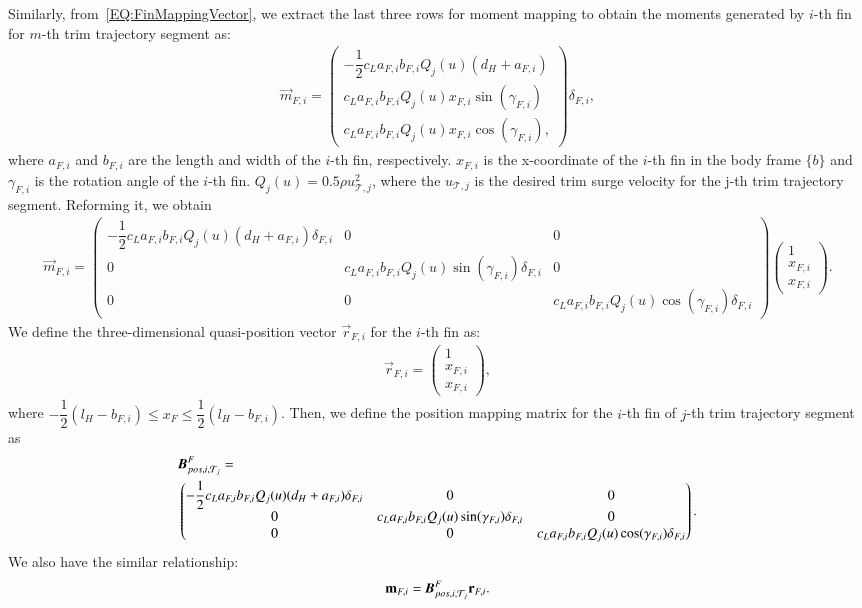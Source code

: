 Similarly, from~\ref{EQ:FinMappingVector}, we extract the last three rows for moment mapping to obtain the moments generated by $i$-th fin for $m$-th trim trajectory segment as:
\begin{align}
\vec{m}_{F,i}=
\begin{pmatrix}
-\dfrac{1}{2}c_{L}a_{F,i}b_{F,i}Q_{j}(u)(d_{H}+a_{F,i})\\
c_{L}a_{F,i}b_{F,i}Q_{j}(u)x_{F,i}\sin(\gamma_{F,i})\\
c_{L}a_{F,i}b_{F,i}Q_{j}(u)x_{F,i}\cos(\gamma_{F,i}),
\end{pmatrix}\delta_{F,i},
\end{align}
where $a_{F,i}$ and $b_{F,i}$ are the length and width of the $i$-th fin, respectively. $x_{F,i}$ is the x-coordinate of the $i$-th fin in the body frame $\lbrace b \rbrace$ and $\gamma_{F,i}$ is the rotation angle of the $i$-th fin. $Q_{j}(u)=0.5\rho u_{\mathcal{T},j}^{2}$, where the $u_{\mathcal{T},j}$ is the desired trim surge velocity for the j-th trim trajectory segment. 
Reforming it, we obtain
\begin{align}
\vec{m}_{F,i}=
\begin{pmatrix}
-\dfrac{1}{2}c_{L}a_{F,i}b_{F,i}Q_{j}(u)(d_{H}+a_{F,i})\delta_{F,i}&0&0\\
0&c_{L}a_{F,i}b_{F,i}Q_{j}(u)\sin(\gamma_{F,i})\delta_{F,i}&0\\
0&0&c_{L}a_{F,i}b_{F,i}Q_{j}(u)\cos(\gamma_{F,i})\delta_{F,i}
\end{pmatrix}
\begin{pmatrix}
1\\x_{F,i}\\x_{F,i}
\end{pmatrix}.
\end{align}
We define the three-dimensional quasi-position vector $\vec{r}_{F,i}$ for the $i$-th fin as:
\begin{align}
\vec{r}_{F,i}=\begin{pmatrix}
1\\x_{F,i}\\x_{F,i}
\end{pmatrix},
\end{align}
where $-\dfrac{1}{2}(l_{H}-b_{F,i})\leq x_{F} \leq \dfrac{1}{2}(l_{H}-b_{F,i})$. Then, we define the position mapping matrix for the $i$-th fin of $j$-th trim trajectory segment as
\begin{align}
&\emph{\textbf{B}}_{pos,i,\mathcal{T}_{j}}^{F}= \nonumber \\
&\begin{pmatrix}
-\dfrac{1}{2}c_{L}a_{F,i}b_{F,i}Q_{j}(u)(d_{H}+a_{F,i})\delta_{F,i}&0&0\\
0&c_{L}a_{F,i}b_{F,i}Q_{j}(u)\sin(\gamma_{F,i})\delta_{F,i}&0\\
0&0&c_{L}a_{F,i}b_{F,i}Q_{j}(u)\cos(\gamma_{F,i})\delta_{F,i}
\end{pmatrix}.
\end{align} 
We also have the similar relationship:
\begin{align}
\vec{m}_{F,i}=\emph{\textbf{B}}_{pos,i,\mathcal{T}_{j}}^{F}\vec{r}_{F,i}.
\end{align}

